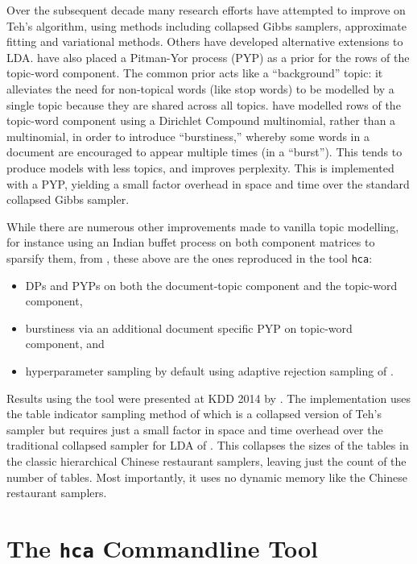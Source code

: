 \documentclass[twoside,11pt]{article}
\begin{document}
Over the subsequent decade many
research efforts have attempted to improve on Teh's algorithm,
using methods including collapsed Gibbs
samplers, approximate fitting and variational methods.
Others have developed alternative extensions to LDA.
\cite{Sato:2010} have also placed a Pitman-Yor process (PYP) as a prior
for the rows of the topic-word component.
The common prior acts like a ``background'' topic: it alleviates the need
for non-topical words (like stop words)
to be modelled by a single topic because they are
shared across all topics.
\cite{Doyle:2009} have modelled rows of the topic-word component using
a Dirichlet Compound multinomial, rather than a multinomial,
in order to introduce ``burstiness,'' whereby some words in
a document are encouraged to appear multiple times (in a ``burst'').
This tends to produce models with less topics,
and  improves perplexity.
This is implemented with a PYP, yielding a small factor overhead
in space and time over the standard collapsed Gibbs sampler.

While there are numerous other improvements made to vanilla topic
modelling,
for instance using an Indian buffet process on both
component matrices to sparsify them, from \cite{archambeau2015latent},
these above are the ones reproduced in the tool {\tt hca}:
\begin{itemize}
\item
  DPs and PYPs on both
  the document-topic component and the topic-word component,
\item
  burstiness via an additional document specific PYP on
  topic-word component, and
\item
  hyperparameter sampling
  by default using adaptive rejection sampling of
  \cite{gilks1992adaptive}.
\end{itemize}
Results using the tool were presented at KDD 2014 by
\cite{buntinemishra14}.
The implementation uses the table indicator sampling method of
\cite{chen2011sampling} which is a collapsed version of
Teh's sampler but requires just a small factor in
space and time overhead over the traditional
collapsed sampler for LDA of \cite{griffiths2004finding}.
This collapses the sizes of the tables in the classic
hierarchical Chinese restaurant samplers, leaving just the
count of the number of tables.
Most importantly, it uses no dynamic memory like the Chinese restaurant
samplers.

\section{The {\tt hca} Commandline Tool}
\end{document}
